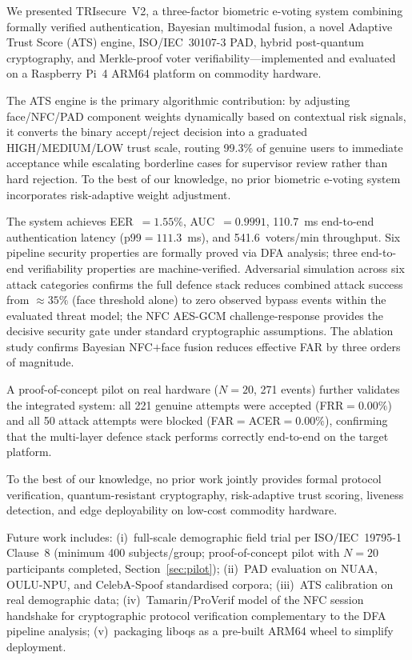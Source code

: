 \documentclass[pdflatex,sn-mathphys-num]{sn-jnl}%
\theoremstyle{thmstyleone}%
\theoremstyle{thmstyletwo}%
\theoremstyle{thmstylethree}%
\begin{document}
We presented TRIsecure~V2, a three-factor biometric e-voting system combining
formally verified authentication, Bayesian multimodal fusion, a novel Adaptive
Trust Score (ATS) engine, ISO/IEC~30107-3 PAD, hybrid post-quantum
cryptography, and Merkle-proof voter verifiability---implemented and evaluated
on a Raspberry Pi~4 ARM64 platform on commodity hardware.

The ATS engine is the primary algorithmic contribution: by adjusting
face/NFC/PAD component weights dynamically based on contextual risk signals, it
converts the binary accept/reject decision into a graduated HIGH/MEDIUM/LOW
trust scale, routing 99.3\% of genuine users to immediate acceptance while
escalating borderline cases for supervisor review rather than hard rejection.
To the best of our knowledge, no prior biometric e-voting system incorporates
risk-adaptive weight adjustment.

The system achieves EER~\(=1.55\%\), AUC~\(=0.9991\), 110.7~ms end-to-end
authentication latency (p99\(=111.3\)~ms), and 541.6~voters/min throughput.
Six pipeline security properties are formally proved via DFA analysis; three
end-to-end verifiability properties are machine-verified. Adversarial
simulation across six attack categories confirms the full defence stack reduces
combined attack success from \(\approx35\%\) (face threshold alone) to zero
observed bypass events within the evaluated threat model; the NFC AES-GCM
challenge-response provides the decisive security gate under standard
cryptographic assumptions. The ablation study confirms Bayesian NFC\(+\)face
fusion reduces effective FAR by three orders of magnitude.

A proof-of-concept pilot on real hardware (\(N{=}20\), 271 events) further
validates the integrated system: all 221 genuine attempts were accepted
(FRR\(=0.00\%\)) and all 50 attack attempts were blocked
(FAR\(=\)ACER\(=0.00\%\)), confirming that the multi-layer defence stack
performs correctly end-to-end on the target platform.

To the best of our knowledge, no prior work jointly provides formal protocol
verification, quantum-resistant cryptography, risk-adaptive trust scoring,
liveness detection, and edge deployability on low-cost commodity hardware.

Future work includes: (i)~full-scale demographic field trial per
ISO/IEC~19795-1 Clause~8 (minimum 400 subjects/group; proof-of-concept pilot
with \(N{=}20\) participants completed, Section~\ref{sec:pilot});
(ii)~PAD evaluation on NUAA, OULU-NPU, and CelebA-Spoof standardised corpora;
(iii)~ATS calibration on real demographic data;
(iv)~Tamarin/ProVerif model of the NFC session handshake for cryptographic
protocol verification complementary to the DFA pipeline analysis;
(v)~packaging liboqs as a pre-built ARM64 wheel to simplify deployment.
\end{document}
